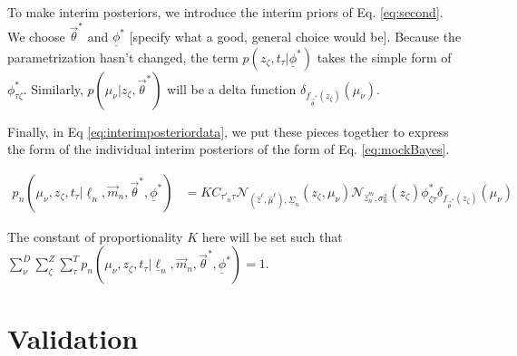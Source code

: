 \documentclass[12pt, onecolumn]{emulateapj}
\newcommand{\textul}{\underline}
\begin{document}
To make interim posteriors, we introduce the interim priors of Eq. \ref{eq:second}.  We choose $\vec{\theta}^{*}$ and $\textul{\phi}^{*}$ [specify what a good, general choice would be].  Because the parametrization hasn't changed, the term $p(z_{\zeta}, t_{\tau} | \textul{\phi}^{*})$ takes the simple form of $\phi^{*}_{\tau\zeta}$.  Similarly, $p(\mu_{\nu} | z_{\zeta}, \vec{\theta}^{*})$ will be a delta function $\delta_{f_{\vec{\theta}^{*}}(z_{\zeta})}(\mu_{\nu})$.  

Finally, in Eq \ref{eq:interimposteriordata}, we put these pieces together to express the form of the individual interim posteriors of the form of Eq. \ref{eq:mockBayes}.

\begin{align}
\label{eq:interimposteriordata}
p_{n}(\mu_{\nu}, z_{\zeta}, t_{\tau} | \textul{\ell}_{n}, \vec{m}_{n}, \vec{\theta}^{*}, \textul{\phi}^{*}) &= KC_{\tau'_{n}\tau}\mathcal{N}_{(\hat{z}^{\ell}, \hat{\mu}^{\ell}), \textul{\Sigma}_{n}}(z_{\zeta}, \mu_{\nu}) \mathcal{N}_{\hat{z}_{n}^{m}, \sigma_{n}^{2}}(z_{\zeta}) \phi^{*}_{\zeta\tau}\delta_{f_{\vec{\theta}^{*}}(z_{\zeta})}(\mu_{\nu})
\end{align}

The constant of proportionality $K$ here will be set such that $\sum_{\nu}^{D}\sum_{\zeta}^{Z}\sum_{\tau}^{T} p_{n}(\mu_{\nu}, z_{\zeta}, t_{\tau} | \textul{\ell}_{n}, \vec{m}_{n}, \vec{\theta}^{*}, \textul{\phi}^{*})=1$.



\section{Validation}
\end{document}
